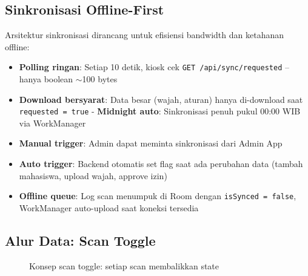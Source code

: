 \documentclass[12pt,a4paper]{article}
\begin{document}
\subsection{Sinkronisasi Offline-First}

Arsitektur sinkronisasi dirancang untuk efisiensi bandwidth dan ketahanan offline:

\begin{itemize}[nolistsep]
  \item \textbf{Polling ringan}: Setiap 10 detik, kiosk cek \texttt{GET /api/sync/requested} -- hanya boolean $\sim$100 bytes
  \item \textbf{Download bersyarat}: Data besar (wajah, aturan) hanya di-download saat \texttt{requested = true}
  - \textbf{Midnight auto}: Sinkronisasi penuh pukul 00:00 WIB via WorkManager
  \item \textbf{Manual trigger}: Admin dapat meminta sinkronisasi dari Admin App
  \item \textbf{Auto trigger}: Backend otomatis set flag saat ada perubahan data (tambah mahasiswa, upload wajah, approve izin)
  \item \textbf{Offline queue}: Log scan menumpuk di Room dengan \texttt{isSynced = false}, WorkManager auto-upload saat koneksi tersedia
\end{itemize}

\subsection{Alur Data: Scan Toggle}

\begin{figure}[H]
  \centering
  \caption{Konsep scan toggle: setiap scan membalikkan state}
\end{figure}
\end{document}
